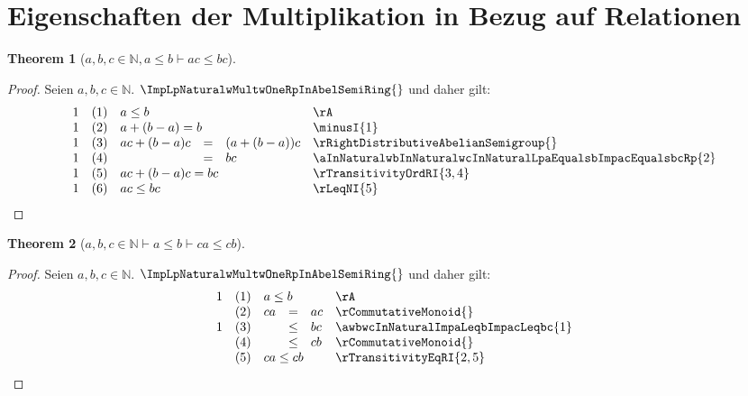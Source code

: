 \documentclass{book}
\theoremstyle{plain}
\newtheorem{theorem}{Theorem}
\theoremstyle{remark}
\theoremstyle{definition}
\begin{document}
\section{Eigenschaften der Multiplikation in Bezug auf Relationen}

\label{awbwcInNaturalImpaLeqbImpacLeqbc}
\begin{theorem}[\(a,b,c\in\mathbb{N},a\leq b\vdash ac\leq bc\)]
\end{theorem}
\begin{proof}
Seien \(a,b,c\in\mathbb{N}\). \(\ImpLpNaturalwMultwOneRpInAbelSemiRing{}\) und daher gilt:
       \[
	\begin{array}{lllcll}
            1       &  (1)  & \multicolumn{3}{l}{a\leq b} & \rA \\
            1       &  (2)  & \multicolumn{3}{l}{a+(b-a)=b} & \minusI{1} \\
            1       &  (3)  & ac+(b-a)c&=&(a+(b-a))c & \rRightDistributiveAbelianSemigroup{} \\       
            1       &  (4)  &  &=&bc & \aInNaturalwbInNaturalwcInNaturalLpaEqualsbImpacEqualsbcRp{2} \\ 
            1       &  (5)  & \multicolumn{3}{l}{ac+(b-a)c=bc} & \rTransitivityOrdRI{3,4} \\ 
            1       &  (6)  & \multicolumn{3}{l}{ac\leq bc} & \rLeqNI{5} \\ 
	\end{array}
        \]

\end{proof}

\label{awbwcInNaturalImpaLeqbImpcaLeqcb}
\begin{theorem}[\(a,b,c\in\mathbb{N}\vdash a\leq b\vdash ca\leq cb\)]
\end{theorem}
\begin{proof}
Seien \(a,b,c\in\mathbb{N}\). \(\ImpLpNaturalwMultwOneRpInAbelSemiRing{}\) und daher gilt:
       \[
	\begin{array}{lllcll}
            1       &  (1)  & \multicolumn{3}{l}{a\leq b} & \rA \\
                    &  (2)  & ca&=&ac & \rCommutativeMonoid{} \\       
            1       &  (3)  &  &\leq &bc & \awbwcInNaturalImpaLeqbImpacLeqbc{1} \\ 
                    &  (4)  &  &\leq &cb & \rCommutativeMonoid{} \\ 
                    &  (5)  & \multicolumn{3}{l}{ca\leq cb} & \rTransitivityEqRI{2,5} \\ 
	\end{array}
        \]
\end{proof}
\end{document}
